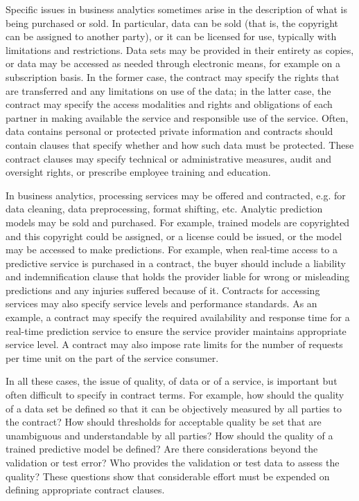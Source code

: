 
Specific issues in business analytics sometimes arise in the description of what is being purchased or sold. In particular, data can be sold (that is, the copyright can be assigned to another party), or it can be licensed for use, typically with limitations and restrictions. Data sets may be provided in their entirety as copies, or data may be accessed as needed through electronic means, for example on a subscription basis. In the former case, the contract may specify the rights that are transferred and any limitations on use of the data; in the latter case, the contract may specify the access modalities and rights and obligations of each partner in making available the service and responsible use of the service. Often, data contains personal or protected private information and contracts should contain clauses that specify whether and how such data must be protected. These contract clauses may specify technical or administrative measures, audit and oversight rights, or prescribe employee training and education. 

In business analytics, processing services may be offered and contracted, e.g. for data cleaning, data preprocessing, format shifting, etc. Analytic prediction models may be sold and purchased. For example, trained models are copyrighted and this copyright could be assigned, or a license could be issued, or the model may be accessed to make predictions. For example, when real-time access to a predictive service is purchased in a contract, the buyer should include a liability and indemnification clause that holds the provider liable for wrong or misleading predictions and any injuries suffered because of it. Contracts for accessing services may also specify service levels and performance standards. As an example, a contract may specify the required availability and response time for a real-time prediction service to ensure the service provider maintains appropriate service level. A contract may also impose rate limits for the number of requests per time unit on the part of the service consumer.

In all these cases, the issue of quality, of data or of a service, is important but often difficult to specify in contract terms. For example, how should the quality of a data set be defined so that it can be objectively measured by all parties to the contract? How should thresholds for acceptable quality be set that are unambiguous and understandable by all parties? How should the quality of a trained predictive model be defined? Are there considerations beyond the validation or test error? Who provides the validation or test data to assess the quality? These questions show that considerable effort must be expended on defining appropriate contract clauses. 

